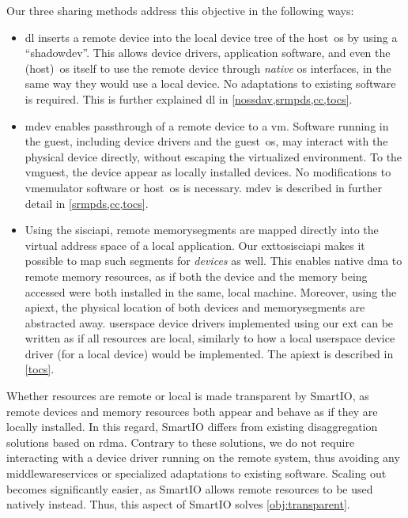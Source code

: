 \objtransparent*%
%
Our three sharing methods address this objective in the following ways:
%
\begin{itemize}
    \item \Gls{dl} inserts a remote device into the local device tree of the \gls{host}~\gls{os} by using a ``\gls{shadowdev}''.
        This allows device drivers, application software, and even the (\gls{host})~\gls{os} itself to use the remote device through \emph{native} \gls{os} interfaces, in the same way they would use a local device.
        No adaptations to existing software is required.
        This is further explained \gls{dl} in \cref{nossdav,srmpds,cc,tocs}.
    


    \item \Gls{mdev} enables \gls{passthrough} of a remote device to a \gls{vm}.
        Software running in the \gls{guest}, including device drivers and the \gls{guest}~\gls{os}, may interact with the physical device directly, without escaping the virtualized environment.
        To the \gls{vmguest}, the device appear as locally installed devices.
        No modifications to \gls{vmemulator} software or \gls{host}~\gls{os} is necessary.
        \Gls{mdev} is described in further detail in \cref{srmpds,cc,tocs}.


    \item Using the \gls{sisciapi}, remote \glspl{memorysegment} are mapped directly into the virtual address space of a local application.
        Our \gls{exttosisciapi} makes it possible to map such \glspl{segment} for \emph{devices} as well.
        This enables native \gls{dma} to remote memory resources, as if both the device and the memory being accessed were both installed in the same, local machine.
        Moreover, using the \gls{apiext}, the physical location of both devices and \glspl{memorysegment} are abstracted away.
        \Gls{userspace} device drivers implemented using our \gls{ext} can be written as if all resources are local, similarly to how a local \gls{userspace} device driver (for a local device) would be implemented.
        The \gls{apiext} is described in \cref{tocs}.
\end{itemize}
%
Whether resources are remote or local is made transparent by SmartIO, as remote devices and memory resources both appear and behave as if they are locally installed.
%
In this regard, SmartIO differs from existing \gls{disaggregation} solutions based on \gls{rdma}.
%
Contrary to these solutions, we do not require interacting with a device driver running on the remote system, thus avoiding any \glspl{middlewareservice} or specialized adaptations to existing software.
%
Scaling out becomes significantly easier, as SmartIO allows remote resources to be used natively instead.
%
Thus, this aspect of SmartIO solves \cref*{obj:transparent}.




